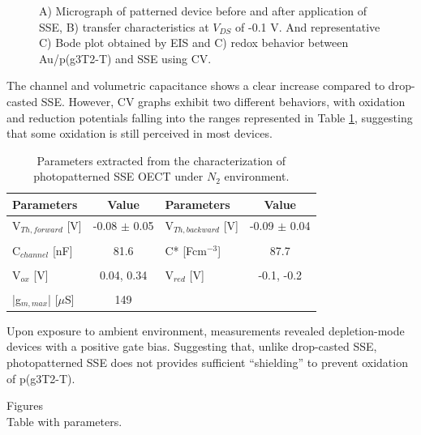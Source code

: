 \begin{figure}[ht]
    \caption[Performance of solid-OECT with photolithographed SSE]{A) Micrograph of patterned device before and after application of SSE, B) transfer characteristics at $V_{DS}$ of -0.1 V. And representative C) Bode plot obtained by EIS and C) redox behavior between Au/p(g3T2-T) and SSE using CV.}
    \label{fig:photoSSE}
\end{figure}

The channel and volumetric capacitance shows a clear increase compared to drop-casted SSE. %
However, CV graphs exhibit two different behaviors, with oxidation and reduction potentials falling into the ranges represented in Table \ref{tab:photofom}, suggesting that some oxidation is still perceived in most devices.

\begin{table}[ht]
\centering
\caption{Parameters extracted from the characterization of photopatterned SSE OECT under $N_{2}$ environment.}
\begin{tabular}{l|c||l|c}
Parameters & Value & Parameters & Value \\\hline \hline
V$_{Th,forward}$ [V] & -0.08 $\pm$ 0.05 & V$_{Th,backward}$ [V] & -0.09 $\pm$ 0.04\\
& & &\\[-1em]
C$_{channel}$ [nF] & 81.6 & C* [Fcm$^{-3}$] & 87.7 \\
& & &\\[-1em]
V$_{ox}$ [V] & 0.04, 0.34  & V$_{red}$ [V] & -0.1, -0.2 \\
& & &\\[-1em]
|g$_{m,max}$| [$\mu$S] & 149 &  &\\\hline
\end{tabular}
\label{tab:photofom}
\end{table}

Upon exposure to ambient environment, measurements revealed depletion-mode devices with a positive gate bias. Suggesting that, unlike drop-casted SSE, photopatterned SSE does not provides sufficient ``shielding'' to prevent oxidation of p(g3T2-T).

Figures\\
Table with parameters.

